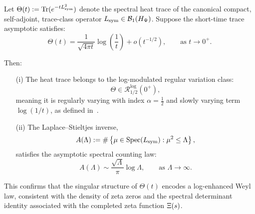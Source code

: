 \begin{lemma}
\label{lem:laplace_kernel_growth_class}

Let \( \Theta(t) := \operatorname{Tr}(e^{-t L_{\mathrm{sym}}^2}) \) denote the spectral heat trace of the canonical compact, self-adjoint, trace-class operator \( L_{\mathrm{sym}} \in \mathcal{B}_1(H_{\Psi}) \). Suppose the short-time trace asymptotic satisfies:
\[
\Theta(t) = \frac{1}{\sqrt{4\pi t}} \log\left( \frac{1}{t} \right) + o(t^{-1/2}),
\qquad \text{as } t \to 0^+.
\]

Then:

\begin{enumerate}
  \item[\textup{(i)}] The heat trace belongs to the log-modulated regular variation class:
  \[
  \Theta \in \mathcal{R}_{1/2}^{\log}(0^+),
  \]
  meaning it is regularly varying with index \( \alpha = \tfrac{1}{2} \) and slowly varying term \( \log(1/t) \), as defined in~\cite[Ch.~III, §5]{Korevaar2004Tauberian}.

  \item[\textup{(ii)}] The Laplace–Stieltjes inverse,
  \[
  A(\Lambda) := \#\left\{ \mu \in \operatorname{Spec}(L_{\mathrm{sym}}) : \mu^2 \le \Lambda \right\},
  \]
  satisfies the asymptotic spectral counting law:
  \[
  A(\Lambda) \sim \frac{\sqrt{\Lambda}}{\pi} \log \Lambda,
  \qquad \text{as } \Lambda \to \infty.
  \]
\end{enumerate}

\noindent
This confirms that the singular structure of \( \Theta(t) \) encodes a log-enhanced Weyl law, consistent with the density of zeta zeros and the spectral determinant identity associated with the completed zeta function \( \Xi(s) \).
\end{lemma}
